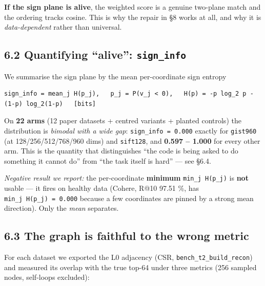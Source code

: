 \documentclass[
  10pt,
]{article}
\begin{document}
\textbf{If the sign plane is alive}, the weighted score is a genuine
two-plane match and the ordering tracks cosine. This is why the repair
in §8 works at all, and why it is \emph{data-dependent} rather than
universal.

\subsection{\texorpdfstring{6.2 Quantifying ``alive'':
\texttt{sign\_info}}{6.2 Quantifying ``alive'': sign\_info}}\label{quantifying-alive-sign_info}

We summarise the sign plane by the mean per-coordinate sign entropy

\begin{verbatim}
sign_info = mean_j H(p_j),   p_j = P(v_j < 0),   H(p) = -p log_2 p - (1-p) log_2(1-p)   [bits]
\end{verbatim}

On \textbf{22 arms} (12 paper datasets + centred variants + planted
controls) the distribution is \emph{bimodal with a wide gap}:
\texttt{sign\_info\ =\ 0.000} exactly for \texttt{gist960} (at
128/256/512/768/960 dims) and \texttt{sift128}, and \textbf{0.597 --
1.000} for every other arm. This is the quantity that distinguishes
``the code is being asked to do something it cannot do'' from ``the task
itself is hard'' --- see §6.4.

\emph{Negative result we report:} the per-coordinate \textbf{minimum}
\texttt{min\_j\ H(p\_j)} is \textbf{not} usable --- it fires on healthy
data (Cohere, R@10 97.51 \%, has \texttt{min\_j\ H(p\_j)\ =\ 0.000}
because a few coordinates are pinned by a strong mean direction). Only
the \emph{mean} separates.

\subsection{6.3 The graph is faithful to the wrong
metric}\label{the-graph-is-faithful-to-the-wrong-metric}

For each dataset we exported the L0 adjacency (CSR,
\texttt{bench\_t2\_build\_recon}) and measured its overlap with the true
top-64 under three metrics (256 sampled nodes, self-loops excluded):
\end{document}
